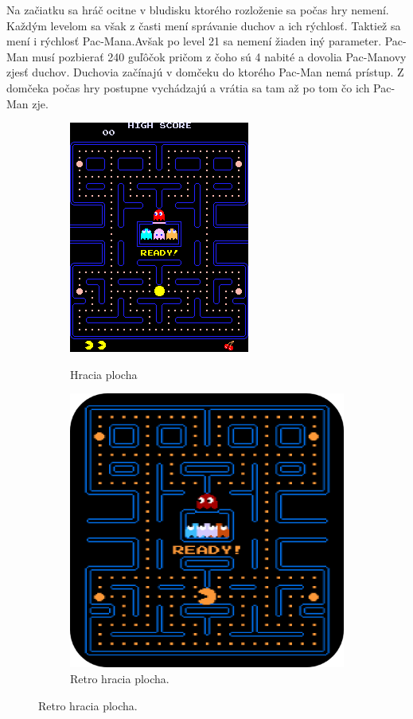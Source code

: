 \documentclass[10pt,oneside,slovak,a4paper]{article}
\begin{document}
Na začiatku sa hráč ocitne v bludisku ktorého rozloženie sa počas hry nemení. Každým levelom sa však z časti mení správanie duchov a ich rýchlosť. Taktiež sa mení i rýchlosť Pac-Mana.Avšak po level 21 sa nemení žiaden iný parameter. Pac-Man musí pozbierať 240 guľôčok pričom z čoho sú 4 nabité a dovolia Pac-Manovy zjesť duchov. Duchovia začínajú v domčeku do ktorého Pac-Man nemá prístup. Z domčeka počas hry postupne vychádzajú a vrátia sa tam až po tom čo ich Pac-Man zje.
\begin{figure}[h!]
  \centering
  \begin{subfigure}[b]{0.4\linewidth}
    \includegraphics[scale=0.35]{pacman start.png}
    \caption{Hracia plocha }\cite{2.zdroj}
  \end{subfigure}
  \begin{subfigure}[b]{0.4\linewidth}
    \includegraphics[scale=0.2]{retro pacman.png}
    \caption{Retro hracia plocha.}
  \end{subfigure}
\end{figure}
\end{document}
